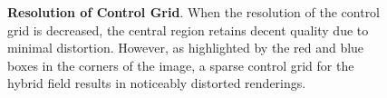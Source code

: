 {\begin{figure}[t]
    \centering
    \setlength{\tabcolsep}{1pt} %
    \caption{\textbf{Resolution of Control Grid}. When the resolution of the control grid is decreased, the central region retains decent quality due to minimal distortion. However, as highlighted by the red and blue boxes in the corners of the image, a sparse control grid for the hybrid field results in noticeably distorted renderings.}
    \label{fig:control_pts_resolution}
\end{figure}
}